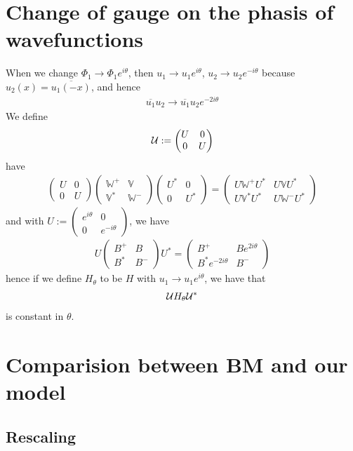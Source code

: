 \documentclass[11pt,a4paper,reqno,french,tikz]{amsart}
\newcommand{\mat}[1]{\begin{pmatrix} #1 \end{pmatrix}} %
\newcommand{\bbV}{\mathbb{V}}
\def\bbV{{\mathbb V}}
\def\bbW{{\mathbb W}}
\begin{document}
\section{Change of gauge on the phasis of wavefunctions}%
\label{sec:change_of_gauge_on_the_phasis_of_wavefunctions}

When we change $\Phi_1 \rightarrow \Phi_1 e^{i\theta}$, then $u_1 \rightarrow u_1 e^{i\theta}$, $u_2 \rightarrow u_2 e^{-i\theta}$ because $u_2(x) = \overline{u_1(-x)}$, and hence
\begin{align*}
\boxed{\overline{u_1} u_2 \rightarrow \overline{u_1} u_2 e^{-2i\theta}}
\end{align*}
We define
\begin{align*}
	\cU := \mat{U & 0 \\ 0 & U}
\end{align*}
have
\begin{align*}
	\mat{U & 0 \\ 0 & U} \mat{\bbW^+ & \bbV \\ \bbV^* & \bbW^-}  \mat{U^* & 0 \\ 0 & U^*} = \mat{U\bbW^+ U^* & U\bbV U^*\\ U\bbV^*U^* & U\bbW^-U^*}
\end{align*}
and with $U := \mat{e^{i\theta} & 0 \\  0 & e^{-i\theta}}$, we have
\begin{align*}
	U \mat{B^+ & B \\ B^* & B^-} U^* = \mat{B^+ & B e^{2i\theta} \\ B^* e^{-2i\theta} & B^-}
\end{align*}
hence if we define $H_\theta$ to be $H$ with $u_1 \rightarrow u_1 e^{i\theta}$, we have that
\begin{align*}
\mathcal{U} H_\theta \mathcal{U}^*
\end{align*}
is constant in $\theta$.


\section{Comparision between BM and our model}%
\label{sec:comparision_between_bm_and_our_model}


\subsection{Rescaling}%
\label{sub:rescaling}
\end{document}
